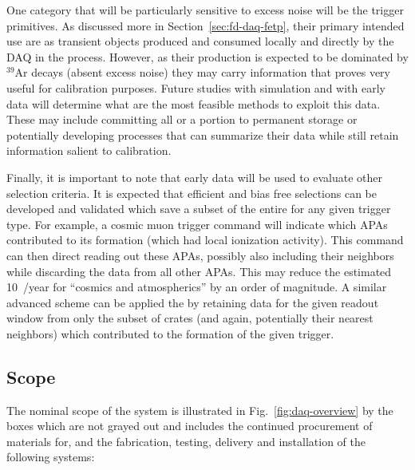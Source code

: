 One category that will be particularly sensitive to excess noise will
be the trigger primitives. 
As discussed more in Section~\ref{sec:fd-daq-fetp}, their primary
intended use are as transient objects produced and consumed locally
and directly by the DAQ in the  process. 
However, as their production is expected to be dominated by $^{39}$Ar
decays (absent excess noise) they may carry information that proves
very useful for calibration purposes. 
Future studies with simulation and with early data will determine what
are the most feasible methods to exploit this data. 
These may include committing all or a portion to permanent storage or
potentially developing processes that can summarize their data while
still retain information salient to calibration.

Finally, it is important to note that early data will be used to
evaluate other selection criteria. 
It is expected that efficient and bias free selections can be
developed and validated which save a subset of the entire
 for any given trigger type. 
For example, a cosmic muon trigger command will indicate which APAs
contributed to its formation (which had local ionization activity). 
This command can then direct reading out these APAs, possibly also
including their neighbors while discarding the data from all other
APAs. 
This may reduce the estimated \SI{10}{\PB/year} for ``cosmics and
atmospherics'' by an order of magnitude. 
A similar advanced scheme can be applied the 
 by retaining data for the given readout window from
only the subset of  crates (and again, potentially their
nearest neighbors) which contributed to the formation of the given
trigger.



\subsection{Scope}
\label{sec:fd-daq-scope}


The nominal scope of the  system is illustrated in
Fig.~\ref{fig:daq-overview} by the boxes which are not grayed out and
includes the continued procurement of materials for, and the
fabrication, testing, delivery and installation of the following
systems:

